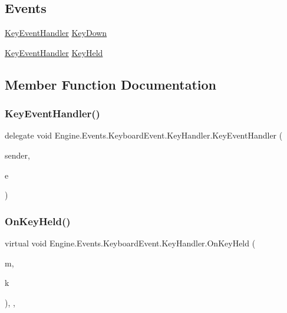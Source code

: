 \subsection*{Events}
\begin{DoxyCompactItemize}
\item 
\hyperlink{a00366_a0052951197567196fd40ae4d5e7784e1}{Key\+Event\+Handler} \hyperlink{a00366_a71d157bc95a647a5605b9a51e4eab6ea}{Key\+Down}
\item 
\hyperlink{a00366_a0052951197567196fd40ae4d5e7784e1}{Key\+Event\+Handler} \hyperlink{a00366_a8994ba327c6d3f3db097a0308f8ced78}{Key\+Held}
\end{DoxyCompactItemize}


\subsection{Member Function Documentation}
\mbox{\label{a00366_a0052951197567196fd40ae4d5e7784e1}} 
\subsubsection{\texorpdfstring{Key\+Event\+Handler()}{KeyEventHandler()}}
{\footnotesize\ttfamily delegate void Engine.\+Events.\+Keyboard\+Event.\+Key\+Handler.\+Key\+Event\+Handler (\begin{DoxyParamCaption}\item[{object}]{sender,  }\item[{\hyperlink{a00362}{Key\+Event\+Args}}]{e }\end{DoxyParamCaption})}

\mbox{\label{a00366_a8c5bdbe22012f4f6e7febca2c29ec880}} 
\subsubsection{\texorpdfstring{On\+Key\+Held()}{OnKeyHeld()}}
{\footnotesize\ttfamily virtual void Engine.\+Events.\+Keyboard\+Event.\+Key\+Handler.\+On\+Key\+Held (\begin{DoxyParamCaption}\item[{Keyboard\+State}]{m,  }\item[{Keys}]{k }\end{DoxyParamCaption})\hspace{0.3cm}{\ttfamily [inline]}, {\ttfamily [protected]}, {\ttfamily [virtual]}}

